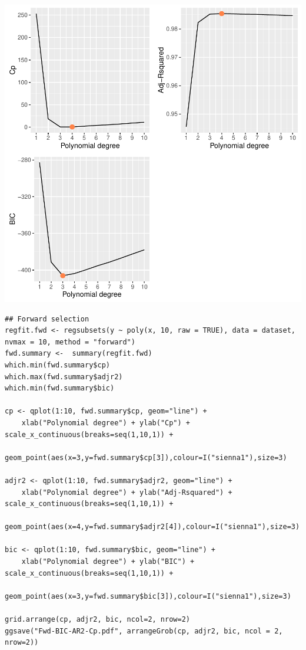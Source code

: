 \documentclass[11pt, a4paper]{article}
\begin{document}
\includegraphics[scale=1]{BIC-AR2-Cp.pdf}


\begin{verbatim}
## Forward selection
regfit.fwd <- regsubsets(y ~ poly(x, 10, raw = TRUE), data = dataset, nvmax = 10, method = "forward")
fwd.summary <-  summary(regfit.fwd)
which.min(fwd.summary$cp)
which.max(fwd.summary$adjr2)
which.min(fwd.summary$bic)

cp <- qplot(1:10, fwd.summary$cp, geom="line") +
    xlab("Polynomial degree") + ylab("Cp") + scale_x_continuous(breaks=seq(1,10,1)) +
    geom_point(aes(x=3,y=fwd.summary$cp[3]),colour=I("sienna1"),size=3)

adjr2 <- qplot(1:10, fwd.summary$adjr2, geom="line") +
    xlab("Polynomial degree") + ylab("Adj-Rsquared") + scale_x_continuous(breaks=seq(1,10,1)) +
    geom_point(aes(x=4,y=fwd.summary$adjr2[4]),colour=I("sienna1"),size=3)

bic <- qplot(1:10, fwd.summary$bic, geom="line") +
    xlab("Polynomial degree") + ylab("BIC") + scale_x_continuous(breaks=seq(1,10,1)) +
    geom_point(aes(x=3,y=fwd.summary$bic[3]),colour=I("sienna1"),size=3)

grid.arrange(cp, adjr2, bic, ncol=2, nrow=2)
ggsave("Fwd-BIC-AR2-Cp.pdf", arrangeGrob(cp, adjr2, bic, ncol = 2, nrow=2))
\end{verbatim}
\end{document}
